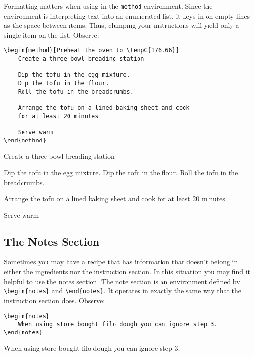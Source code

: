 \par Formatting matters when using in the \verb|method| environment. Since the environment is interpreting text into an enumerated list, it keys in on empty lines as the space between items. Thus, clumping your instructions will yield only a single item on the list. Observe:

\begin{verbatim}
\begin{method}[Preheat the oven to \tempC{176.66}]
    Create a three bowl breading station 
    
    Dip the tofu in the egg mixture.
    Dip the tofu in the flour.
    Roll the tofu in the breadcrumbs.
    
    Arrange the tofu on a lined baking sheet and cook
    for at least 20 minutes
    
    Serve warm
\end{method}
\end{verbatim}

\begin{method}
    Create a three bowl breading station 
    
    Dip the tofu in the egg mixture.
    Dip the tofu in the flour.
    Roll the tofu in the breadcrumbs.
    
    Arrange the tofu on a lined baking sheet and cook
    for at least 20 minutes
    
    Serve warm
\end{method}

\subsection*{The Notes Section}
Sometimes you may have a recipe that has information that doesn't belong in either the ingredients nor the instruction section. In this situation you may find it helpful to use the notes section. The note section is an environment defined by \verb|\begin{notes}| and \verb|\end{notes}|. It operates in exactly the same way that the instruction section does. Observe:

\begin{verbatim}
\begin{notes}
    When using store bought filo dough you can ignore step 3.
\end{notes}
\end{verbatim}
\begin{notes}
    When using store bought filo dough you can ignore step 3.
\end{notes}

